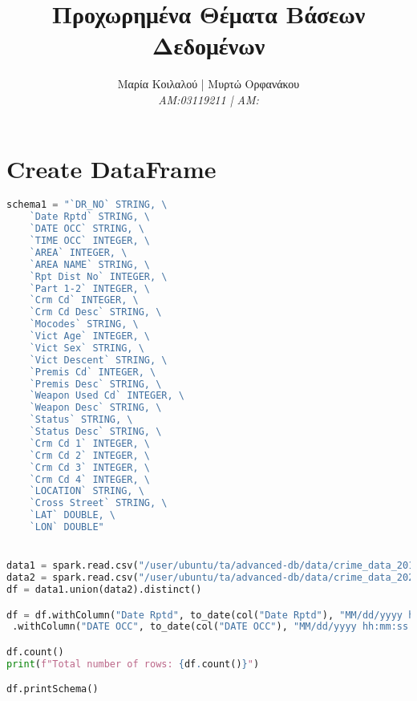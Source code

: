 \documentclass{article}
\title{Προχωρημένα Θέματα Βάσεων Δεδομένων}
\author{Μαρία Κοιλαλού | Μυρτώ Ορφανάκου\\
\textit{AM:03119211 | ΑM:}}
\begin{document}
\maketitle

\vspace{3\baselineskip}

\section{Create DataFrame}

\begin{lstlisting}[language = Python]
    schema1 = "`DR_NO` STRING, \
    `Date Rptd` STRING, \
    `DATE OCC` STRING, \
    `TIME OCC` INTEGER, \
    `AREA` INTEGER, \
    `AREA NAME` STRING, \
    `Rpt Dist No` INTEGER, \
    `Part 1-2` INTEGER, \
    `Crm Cd` INTEGER, \
    `Crm Cd Desc` STRING, \
    `Mocodes` STRING, \
    `Vict Age` INTEGER, \
    `Vict Sex` STRING, \
    `Vict Descent` STRING, \
    `Premis Cd` INTEGER, \
    `Premis Desc` STRING, \
    `Weapon Used Cd` INTEGER, \
    `Weapon Desc` STRING, \
    `Status` STRING, \
    `Status Desc` STRING, \
    `Crm Cd 1` INTEGER, \
    `Crm Cd 2` INTEGER, \
    `Crm Cd 3` INTEGER, \
    `Crm Cd 4` INTEGER, \
    `LOCATION` STRING, \
    `Cross Street` STRING, \
    `LAT` DOUBLE, \
    `LON` DOUBLE"


data1 = spark.read.csv("/user/ubuntu/ta/advanced-db/data/crime_data_2010.csv", header=True, schema=schema1)
data2 = spark.read.csv("/user/ubuntu/ta/advanced-db/data/crime_data_2020.csv", header=True, schema=schema1)
df = data1.union(data2).distinct()

df = df.withColumn("Date Rptd", to_date(col("Date Rptd"), "MM/dd/yyyy hh:mm:ss a")) \
 .withColumn("DATE OCC", to_date(col("DATE OCC"), "MM/dd/yyyy hh:mm:ss a"))

df.count()
print(f"Total number of rows: {df.count()}")

df.printSchema()
\end{lstlisting}

\end{document}
